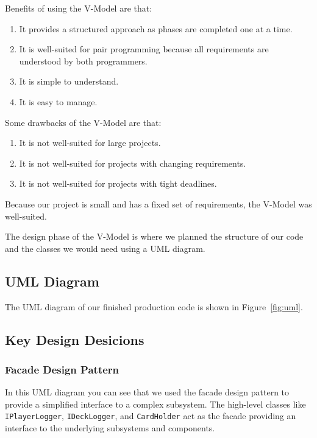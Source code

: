 \documentclass{article}
\begin{document}
Benefits of using the V-Model are that:
\begin{enumerate}
    \item It provides a structured approach as phases are completed one at a time.
    \item It is well-suited for pair programming because all requirements are understood by both programmers.
    \item It is simple to understand.
    \item It is easy to manage.
\end{enumerate}
Some drawbacks of the V-Model are that:
\begin{enumerate}
    \item It is not well-suited for large projects.
    \item It is not well-suited for projects with changing requirements.
    \item It is not well-suited for projects with tight deadlines.
\end{enumerate}
Because our project is small and has a fixed set of requirements, the V-Model was well-suited.

The design phase of the V-Model is where we planned the structure of our code and the classes we would need using a UML diagram.

\subsection{UML Diagram}
The UML diagram of our finished production code is shown in Figure~\ref{fig:uml}.

\subsection{Key Design Desicions}
\subsubsection{Facade Design Pattern}
In this UML diagram you can see that we used the facade design pattern to provide a simplified interface to a complex subsystem. The high-level classes like \texttt{IPlayerLogger}, \texttt{IDeckLogger}, and \texttt{CardHolder} act as the facade providing an interface to the underlying subsystems and components.
\end{document}
